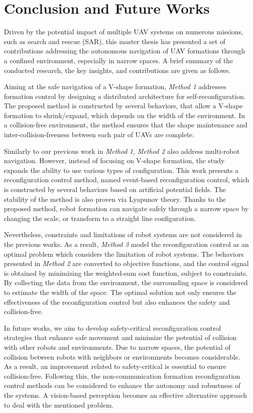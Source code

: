 \chapter{Conclusion and Future Works}\label{conclusion}

Driven by the potential impact of multiple UAV systems on numerous missions, such as search and rescue (SAR), this master thesis has presented a set of contributions addressing the autonomous navigation of UAV formations through a confined environment, especially in narrow spaces. A brief summary of the conducted research, the key insights, and contributions are given as follows.

Aiming at the safe navigation of a V-shape formation, \textit{Method 1} addresses formation control by designing a distributed architecture for self-reconfiguration. The proposed method is constructed by several behaviors, that allow a V-shape formation to shrink/expand, which depends on the width of the environment. In a collision-free environment, the method ensures that the shape maintenance and inter-collision-freeness between each pair of UAVs are complete. 

Similarly to our previous work in \textit{Method 1}, \textit{Method 2} also address multi-robot navigation. However, instead of focusing on V-shape formation, the study expands the ability to use various types of configuration. This work presents a reconfiguration control method, named event-based reconfiguration control, which is constructed by several behaviors based on artificial potential fields. The stability of the method is also proven via Lyapunov theory. Thanks to the proposed method, robot formation can navigate safely through a narrow space by changing the scale, or transform to a straight line configuration.

Nevertheless, constraints and limitations of robot systems are not considered in the previous works. As a result, \textit{Method 3} model the reconfiguration control as an optimal problem which considers the limitation of robot systems. The behaviors presented in \textit{Method 2} are converted to objective functions, and the control signal is obtained by minimizing the weighted-sum cost function, subject to constraints. By collecting the data from the environment, the surrounding space is considered to estimate the width of the space. The optimal solution not only ensures the effectiveness of the reconfiguration control but also enhances the safety and collision-free.

In future works, we aim to develop safety-critical reconfiguration control strategies that enhance safe movement and minimize the potential of collision with other robots and environments. Due to narrow spaces, the potential of collision between robots with neighbors or environments becomes considerable. As a result, an improvement related to safety-critical is essential to ensure collision-free. Following this, the non-communication formation reconfiguration control methods can be considered to enhance the autonomy and robustness of the systems. A vision-based perception becomes an effective alternative approach to deal with the mentioned problem.